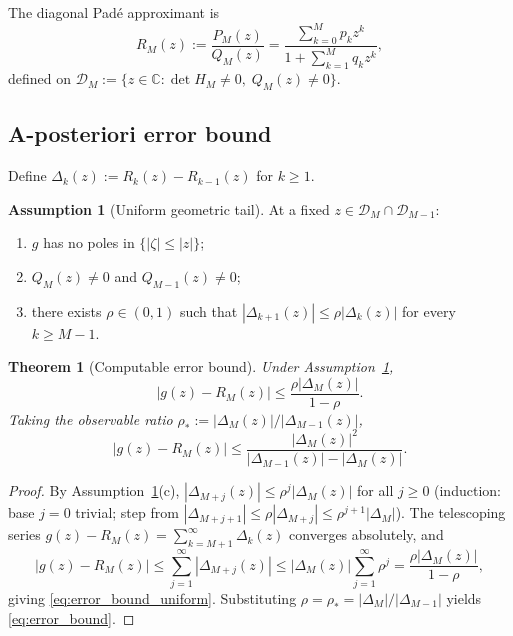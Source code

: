 \documentclass[12pt,a4paper]{amsart}
\newcommand{\assign}{:=}
\theoremstyle{plain}
\newtheorem{theorem}{Theorem}[section]
\theoremstyle{definition}
\newtheorem{assumption}{Assumption}
\theoremstyle{remark}
\begin{document}
The diagonal Pad\'e approximant is
\begin{equation}\label{eq:R_M_def}
  R_M(z)\assign\frac{P_M(z)}{Q_M(z)}
  =\frac{\sum_{k=0}^M p_k z^k}{1+\sum_{k=1}^M q_k z^k},
\end{equation}
defined on $\mathcal{D}_M\assign\{z\in\mathbb{C}:\det H_M\ne 0,\;Q_M(z)\ne 0\}$.

\subsection{A-posteriori error bound}

Define $\Delta_k(z)\assign R_k(z)-R_{k-1}(z)$ for $k\ge 1$.

\begin{assumption}[Uniform geometric tail]\label{ass:diff_bound}
At a fixed $z\in\mathcal{D}_M\cap\mathcal{D}_{M-1}$:
\begin{enumerate}[label=(\alph*)]
  \item $g$ has no poles in $\{|\zeta|\le|z|\}$;
  \item $Q_M(z)\ne 0$ and $Q_{M-1}(z)\ne 0$;
  \item there exists $\rho\in(0,1)$ such that
  $|\Delta_{k+1}(z)|\le\rho|\Delta_k(z)|$ for every $k\ge M-1$.
\end{enumerate}
\end{assumption}

\begin{theorem}[Computable error bound]\label{thm:error}
Under Assumption~\ref{ass:diff_bound},
\begin{equation}\label{eq:error_bound_uniform}
  |g(z)-R_M(z)|\le\frac{\rho|\Delta_M(z)|}{1-\rho}.
\end{equation}
Taking the observable ratio $\rho_*\assign|\Delta_M(z)|/|\Delta_{M-1}(z)|$,
\begin{equation}\label{eq:error_bound}
  |g(z)-R_M(z)|\le\frac{|\Delta_M(z)|^2}{|\Delta_{M-1}(z)|-|\Delta_M(z)|}.
\end{equation}
\end{theorem}

\begin{proof}
By Assumption~\ref{ass:diff_bound}(c), $|\Delta_{M+j}(z)|\le\rho^j|\Delta_M(z)|$
for all $j\ge 0$ (induction: base $j=0$ trivial; step from
$|\Delta_{M+j+1}|\le\rho|\Delta_{M+j}|\le\rho^{j+1}|\Delta_M|$).
The telescoping series $g(z)-R_M(z)=\sum_{k=M+1}^\infty\Delta_k(z)$
converges absolutely, and
\[
  |g(z)-R_M(z)|
  \le\sum_{j=1}^\infty|\Delta_{M+j}(z)|
  \le|\Delta_M(z)|\sum_{j=1}^\infty\rho^j
  =\frac{\rho|\Delta_M(z)|}{1-\rho},
\]
giving \eqref{eq:error_bound_uniform}. Substituting
$\rho=\rho_*=|\Delta_M|/|\Delta_{M-1}|$ yields \eqref{eq:error_bound}.
\end{proof}
\end{document}
